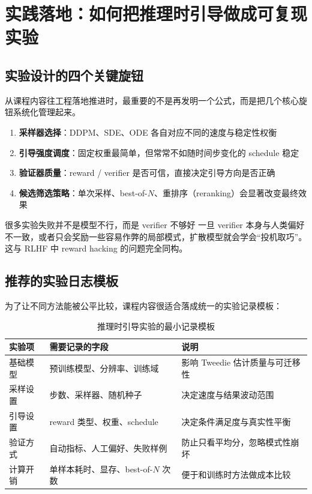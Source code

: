 \section{实践落地：如何把推理时引导做成可复现实验}

\subsection{实验设计的四个关键旋钮}

从课程内容往工程落地推进时，最重要的不是再发明一个公式，而是把几个核心旋钮系统化管理起来。

\begin{enumerate}
    \item \textbf{采样器选择}：DDPM、SDE、ODE 各自对应不同的速度与稳定性权衡
    \item \textbf{引导强度调度}：固定权重最简单，但常常不如随时间步变化的 schedule 稳定
    \item \textbf{验证器质量}：reward / verifier 是否可信，直接决定引导方向是否正确
    \item \textbf{候选筛选策略}：单次采样、best-of-$N$、重排序（reranking）会显著改变最终效果
\end{enumerate}

\begin{importantbox}{很多实验失败并不是模型不行，而是 verifier 不够好}
一旦 verifier 本身与人类偏好不一致，或者只会奖励一些容易作弊的局部模式，扩散模型就会学会``投机取巧''。这与 RLHF 中 reward hacking 的问题完全同构。
\end{importantbox}

\subsection{推荐的实验日志模板}

为了让不同方法能被公平比较，课程内容很适合落成统一的实验记录模板：

\begin{table}[H]
\centering
\begin{tabular}{p{} p{} p{}}
\toprule
实验项 & 需要记录的字段 & 说明 \\
\midrule
基础模型 & 预训练模型、分辨率、训练域 & 影响 Tweedie 估计质量与可迁移性 \\
采样设置 & 步数、采样器、随机种子 & 决定速度与结果波动范围 \\
引导设置 & reward 类型、权重、schedule & 决定条件满足度与真实性平衡 \\
验证方式 & 自动指标、人工偏好、失败样例 & 防止只看平均分，忽略模式性崩坏 \\
计算开销 & 单样本耗时、显存、best-of-$N$ 次数 & 便于和训练时方法做成本比较 \\
\bottomrule
\end{tabular}
\caption{推理时引导实验的最小记录模板}
\end{table}

